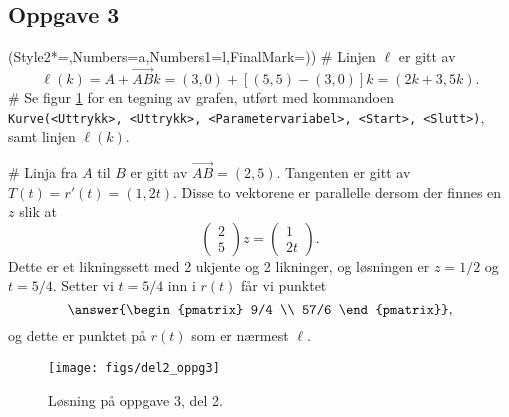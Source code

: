\subsection*{Oppgave 3}
\begin{easylist}[enumerate]
	\ListProperties(Style2*=,Numbers=a,Numbers1=l,FinalMark={)})
	# Linjen $\ell$ er gitt av
	\begin{equation*}
	\ell(k) = A + \vec{AB} k = (3, 0) + \left[ (5, 5) - (3, 0) \right] k = (2k+3, 5k).
	\end{equation*}
	# Se figur \ref{fig:del2_oppg3} for en tegning av grafen, utført med kommandoen \\
	\verb|Kurve(<Uttrykk>, <Uttrykk>, <Parametervariabel>, <Start>, <Slutt>)|,\\
	samt linjen $\ell(k)$.
	
	
	# Linja fra $A$ til $B$ er gitt av $\vec{AB} = (2, 5)$.
	Tangenten er gitt av $T(t) = r'(t) = (1, 2t)$.
	Disse to vektorene er parallelle dersom der finnes en $z$ slik at
	\begin{equation*}
	\begin{pmatrix}
	2 \\
	5
	\end{pmatrix} z =
	\begin{pmatrix}
	1 \\
	2t
	\end{pmatrix}.
	\end{equation*}
	Dette er et likningssett med 2 ukjente og 2 likninger, og løsningen er $z = 1/2$ og $t = 5/4$.
	Setter vi $t = 5/4$ inn i $r(t)$ får vi punktet 
	\begin{equation*}
	\answer{\begin{pmatrix}
		9/4 \\
		57/6
		\end{pmatrix}},
	\end{equation*}
	og dette er punktet på $r(t)$ som er nærmest $\ell$.
\end{easylist}


\begin{figure}[ht!]
	\centering
	\texttt{[image: figs/del2\_oppg3]}
	\caption{Løsning på oppgave 3, del 2.}
	\label{fig:del2_oppg3}
\end{figure}


